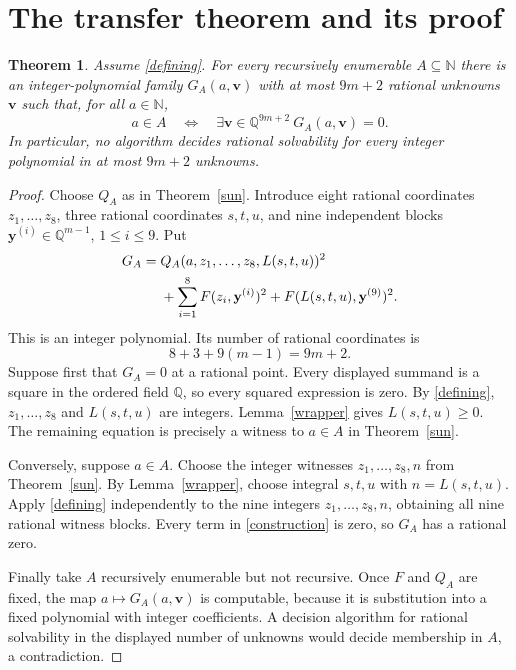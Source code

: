 \documentclass[11pt,a4paper]{article}
\newtheorem{theorem}{Theorem}[section]
\newcommand{\Q}{\mathbb Q}\newcommand{\Z}{\mathbb Z}\newcommand{\N}{\mathbb N}
\begin{document}
\section{The transfer theorem and its proof}
\begin{theorem}\label{main}
Assume \eqref{defining}. For every recursively enumerable $A\subseteq\N$ there is
an integer-polynomial family $G_A(a,\mathbf v)$ with at most $9m+2$ rational
unknowns $\mathbf v$ such that, for all $a\in\N$,
\[
 a\in A\quad\Longleftrightarrow\quad
 \exists\mathbf v\in\Q^{9m+2}\ G_A(a,\mathbf v)=0.
\]
In particular, no algorithm decides rational solvability for every integer
polynomial in at most $9m+2$ unknowns.
\end{theorem}
\begin{proof}
Choose $Q_A$ as in Theorem~\ref{sun}. Introduce eight rational coordinates
$z_1,\ldots,z_8$, three rational coordinates $s,t,u$, and nine independent
blocks $\mathbf y^{(i)}\in\Q^{m-1}$, $1\le i\le9$. Put
\begin{align}\label{construction}
 G_A={}&Q_A(a,z_1,\ldots,z_8,L(s,t,u))^2\notag\\
 &+\sum_{i=1}^{8}F(z_i,\mathbf y^{(i)})^2
   +F(L(s,t,u),\mathbf y^{(9)})^2.
\end{align}
This is an integer polynomial. Its number of rational coordinates is
\[
 8+3+9(m-1)=9m+2.
\]
Suppose first that $G_A=0$ at a rational point. Every displayed summand
is a square in the ordered field $\Q$, so every squared expression is zero.
By \eqref{defining}, $z_1,\ldots,z_8$ and $L(s,t,u)$ are integers.
Lemma~\ref{wrapper} gives $L(s,t,u)\ge0$. The remaining equation is precisely
a witness to $a\in A$ in Theorem~\ref{sun}.

Conversely, suppose $a\in A$. Choose the integer witnesses $z_1,\ldots,z_8,n$
from Theorem~\ref{sun}. By Lemma~\ref{wrapper}, choose integral $s,t,u$ with
$n=L(s,t,u)$. Apply \eqref{defining} independently to the nine integers
$z_1,\ldots,z_8,n$, obtaining all nine rational witness blocks. Every term
in \eqref{construction} is zero, so $G_A$ has a rational zero.

Finally take $A$ recursively enumerable but not recursive. Once $F$ and $Q_A$
are fixed, the map $a\mapsto G_A(a,\mathbf v)$ is computable, because it is
substitution into a fixed polynomial with integer coefficients. A decision
algorithm for rational solvability in the displayed number of unknowns
would decide membership in $A$, a contradiction.
\end{proof}
\end{document}
